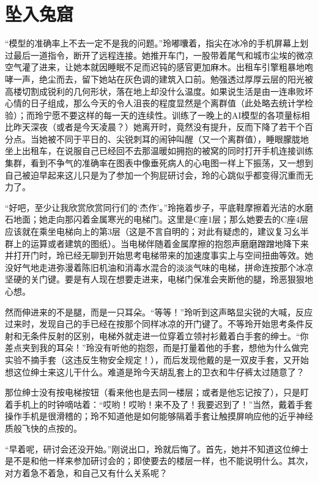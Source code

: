 \chapter{坠入兔窟}

“模型的准确率上不去一定不是我的问题。”玲嘟囔着，指尖在冰冷的手机屏幕上划过最后一道指令，断开了远程连接。她推开车门，一股带着尾气和城市尘埃的微凉空气灌了进来，让她本就因睡眠不足而迟钝的感官更加麻木。出租车引擎粗暴地咆哮一声，绝尘而去，留下她站在灰色调的建筑入口前。勉强透过厚厚云层的阳光被高楼切割成锐利的几何形状，落在地上却没什么温度。如果说生活是由一连串败坏心情的日子组成，那么今天的令人沮丧的程度显然是个离群值（此处略去统计学检验）；而玲宁愿不要这样的每一天的连续性。训练了一晚上的AI模型的各项量标相比昨天深夜（或者是今天凌晨？）她离开时，竟然没有提升，反而下降了若干个百分点。当她被不同于平日的、尖锐刺耳的闹钟叫醒（又一个离群值），睡眼朦胧地坐上出租车，在说服自己已经回不去那温暖如拥抱的被窝的同时打开手机连接训练集群，看到不争气的准确率在图表中像垂死病人的心电图一样上下振荡，又一想到自己被迫早起来这儿只是为了参加一个狗屁研讨会，玲的心跳似乎都变得沉重而无力了。

“好吧，至少让我欣赏欣赏同行们的‘杰作’。”玲拖着步子，平底鞋摩擦着光洁的水磨石地面；她走向那闪着金属寒光的电梯门。这里是C座1层；那么她要去的C座4层应该就在乘坐电梯向上的第3层（这是不言自明的；对此有疑虑的，建议复习幺半群上的运算或者建筑的图纸）。当电梯伴随着金属摩擦的抱怨声磨磨蹭蹭地降下来并打开门时，玲已经无聊到开始思考电梯带来的加速度事实上与空间扭曲等效。她没好气地走进弥漫着陈旧机油和消毒水混合的淡淡气味的电梯，拼命连按那个冰凉坚硬的关门键。要是有人现在想要走进来，电梯门保准会夹断他的腿，玲恶狠狠地心想。

然而伸进来的不是腿，而是一只耳朵。“等等！”玲听到这声略显尖锐的大喊，反应过来时，发现自己的手已经在按那个同样冰凉的开门键了。不等玲开始思考条件反射和无条件反射的区别，电梯外就走进一位穿着立领衬衫戴着白手套的绅士。“你差点夹到我的耳朵！”玲没有听他的抱怨，而是打量着他的手套，想他为什么做完实验不摘手套（这违反生物安全规定！），而后发现他戴的是一双皮手套，又开始想这位绅士来这儿干什么。难道是玲今天胡乱套上的卫衣和牛仔裤太过随意了？

那位绅士没有按电梯按钮（看来他也是去同一楼层；或者是他忘记按了），只是盯着手机上的时钟嘀咕着：“哎哟！哎哟！来不及了！我要迟到了！”当然，戴着手套操作手机是很滑稽的；玲不知道他是如何能够隔着手套让触摸屏响应他的近乎神经质般飞快的点按的。

“早着呢，研讨会还没开始。”刚说出口，玲就后悔了。首先，她并不知道这位绅士是不是和他一样来参加研讨会的；即使要去的楼层一样，也不能说明什么。其次，对方着急不着急，和自己又有什么关系呢？

